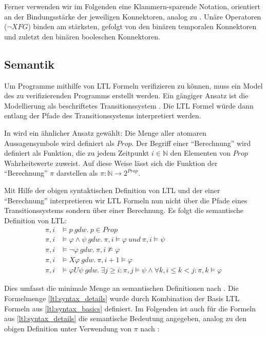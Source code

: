 Ferner verwenden wir im Folgenden eine Klammern-sparende Notation, orientiert an der Bindungsstärke der jeweiligen Konnektoren, analog zu \cite{huth+04}. Unäre Operatoren ($\lnot X F G$) binden am stärksten, gefolgt von den binären temporalen Konnektoren und zuletzt den binären booleschen Konnektoren.


\subsection{Semantik}
\label{ltl:semantik}

Um Programme mithilfe von LTL Formeln verifizieren zu können, muss ein Model des zu verifizierenden Programms erstellt werden. Ein gängiger Ansatz ist die Modellierung als beschriftetes Transitionssystem \cite{huth+04}. Die LTL Formel würde dann entlang der Pfade des Transitionssystems interpretiert werden. 

In \cite{vardi+96} wird ein ähnlicher Ansatz gewählt: Die Menge aller atomaren Aussagensymbole wird definiert als $Prop$. Der Begriff einer "`Berechnung"' wird definiert als Funktion, die zu jedem Zeitpunkt $i \in \mathbb{N}$ den Elementen von $Prop$ Wahrheitswerte zuweist. Auf diese Weise lässt sich die Funktion der "`Berechnung"' $\pi$ darstellen als $\pi : \mathbb{N} \rightarrow 2^{Prop}$. 

Mit Hilfe der obigen syntaktischen Definition von LTL und der einer "`Berechnung"' interpretieren wir LTL Formeln nun nicht über die Pfade eines Transitionssystems sondern über einer Berechnung. Es folgt die semantische Definition von LTL: 
\begin{equation*}
\begin{split}
    \pi, i &\models p\ gdw.\ p \in Prop\\
    \pi, i &\models \varphi \land \psi\ gdw.\ \pi, i \models \varphi\ und\ \pi, i \models \psi\\
    \pi, i &\models \lnot\varphi\ gdw.\ \pi, i \not\models \varphi\\
    \pi, i &\models X\varphi\ gdw.\ \pi, i+1 \models \varphi\\
    \pi, i &\models \varphi U\psi\ gdw.\ \exists j \geq i: \pi, j \models \psi \land \forall k, i\leq k<j: \pi, k \models \varphi
\end{split}
\end{equation*}

Dies umfasst die minimale Menge an semantischen Definitionen nach \cite{vardi+96}. Die Formelmenge \ref{ltl:syntax_details} wurde durch Kombination der Basis LTL Formeln aus \ref{ltl:syntax_basics} definiert. Im Folgenden ist auch für die Formeln aus \ref{ltl:syntax_details} die semantische Bedeutung angegeben, analog zu den obigen Definition unter Verwendung von $\pi$ nach \cite{vardi+96}:

